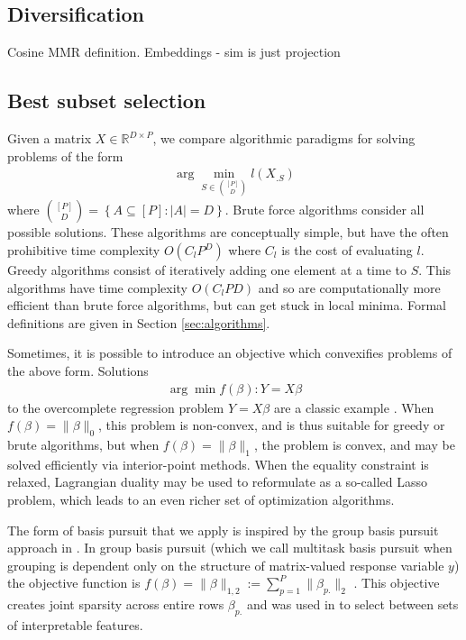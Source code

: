 \subsection{Diversification}

Cosine
MMR definition.
Embeddings - sim is just projection

\subsection{Best subset selection}

Given a matrix $ X \in \mathbb R^{D \times P}$, we compare algorithmic paradigms for solving problems of the form
\begin{align}
\label{prog:ground_truth}
\arg \min_{ S \in \binom{[P]}{D}} l ( X_{. S})
\end{align}
where $\binom{[P]}{D} = \left\{ A \subseteq [P] : \left|A\right| = D \right\}$.
Brute force algorithms consider all possible solutions.
These algorithms are conceptually simple, but have the often prohibitive time complexity $O(C_lP^D)$ where $C_l$ is the cost of evaluating $l$.
Greedy algorithms consist of iteratively adding one element at a time to $ S$.
This algorithms have time complexity $O(C_lPD)$ and so are computationally more efficient than brute force algorithms, but can get stuck in local minima.
Formal definitions are given in Section \ref{sec:algorithms}.

Sometimes, it is possible to introduce an objective which convexifies problems of the above form.
Solutions
\begin{align}
\arg \min f(\beta) : Y  = X\beta 
\end{align}
to the overcomplete regression problem $Y = X \beta$ are a classic example \citep{Chen2001-hh}.
When $f(\beta) = \|\beta\|_0$, this problem is non-convex, and is thus suitable for greedy or brute algorithms, but when $f(\beta) =\|\beta\|_1$, the problem is convex, and may be solved efficiently via interior-point methods.
When the equality constraint is relaxed, Lagrangian duality may be used to reformulate as a so-called Lasso problem, which leads to an even richer set of optimization algorithms. %

The form of basis pursuit that we apply is inspired by the group basis pursuit approach in \citet{Koelle2022-ju}.
In group basis pursuit (which we call multitask basis pursuit when grouping is dependent only on the structure of matrix-valued response variable $y$) the objective function is $f(\beta) = \|\beta\|_{1,2} := \sum_{p=1}^P \|\beta_{p.}\|_2$  \citep{Yuan2006-bt, Obozinski2006-kq, Yeung2011-fg}.
This objective creates joint sparsity across entire rows $\beta_{p.}$ and was used in \citet{Koelle2022-ju} to select between sets of interpretable features.